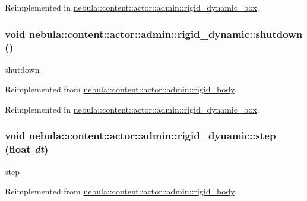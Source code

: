 Reimplemented in \hyperlink{classnebula_1_1content_1_1actor_1_1admin_1_1rigid__dynamic__box_a7e5e4c2e52b7b02c7d667cb74926e8a2}{nebula::content::actor::admin::rigid\_\-dynamic\_\-box}.\hypertarget{classnebula_1_1content_1_1actor_1_1admin_1_1rigid__dynamic_a6b7e8768902a320d8f7f483cf348a059}{
\subsubsection[{shutdown}]{\setlength{\rightskip}{0pt plus 5cm}void nebula::content::actor::admin::rigid\_\-dynamic::shutdown ()}}
\label{classnebula_1_1content_1_1actor_1_1admin_1_1rigid__dynamic_a6b7e8768902a320d8f7f483cf348a059}


shutdown 

Reimplemented from \hyperlink{classnebula_1_1content_1_1actor_1_1admin_1_1rigid__body_ab0ed9e145b42efdd0049e2e1ef7d5da4}{nebula::content::actor::admin::rigid\_\-body}.

Reimplemented in \hyperlink{classnebula_1_1content_1_1actor_1_1admin_1_1rigid__dynamic__box_af3ecd05192435e30fbe258f243d18adc}{nebula::content::actor::admin::rigid\_\-dynamic\_\-box}.\hypertarget{classnebula_1_1content_1_1actor_1_1admin_1_1rigid__dynamic_ae5350e2820c0e00c36c663fc63a8b83c}{
\subsubsection[{step}]{\setlength{\rightskip}{0pt plus 5cm}void nebula::content::actor::admin::rigid\_\-dynamic::step (float {\em dt})}}
\label{classnebula_1_1content_1_1actor_1_1admin_1_1rigid__dynamic_ae5350e2820c0e00c36c663fc63a8b83c}


step 

Reimplemented from \hyperlink{classnebula_1_1content_1_1actor_1_1admin_1_1rigid__body_a91d4e1a3e78ee41a5ddea1974a88045d}{nebula::content::actor::admin::rigid\_\-body}.

